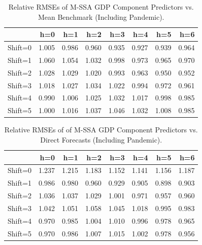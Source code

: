 \documentclass[11pt,a4paper]{article}
\begin{document}
\begin{table}[ht]
\caption{Relative RMSEs of M-SSA GDP Component Predictors vs. Mean Benchmark (Including Pandemic).
\label{tab:rRMSE_mSSA_comp_mean2}}
\centering
\begin{tabular}{rrrrrrrr}
  \hline
 & h=0 & h=1 & h=2 & h=3 & h=4 & h=5 & h=6 \\ 
  \hline
Shift=0 & 1.005 & 0.986 & 0.960 & 0.935 & 0.927 & 0.939 & 0.964 \\ 
  Shift=1 & 1.060 & 1.054 & 1.032 & 0.998 & 0.973 & 0.965 & 0.970 \\ 
  Shift=2 & 1.028 & 1.029 & 1.020 & 0.993 & 0.963 & 0.950 & 0.952 \\ 
  Shift=3 & 1.018 & 1.027 & 1.034 & 1.022 & 0.994 & 0.972 & 0.961 \\ 
  Shift=4 & 0.990 & 1.006 & 1.025 & 1.032 & 1.017 & 0.998 & 0.985 \\ 
  Shift=5 & 1.000 & 1.016 & 1.037 & 1.046 & 1.032 & 1.008 & 0.985 \\  
   \hline
\end{tabular}
\end{table}

\begin{table}[htpb]
\caption{Relative RMSEs of of M-SSA GDP Component Predictors  vs. Direct Forecasts (Including Pandemic).
\label{tab:rRMSE_mSSA_comp_direct3}}
\centering
\begin{tabular}{rrrrrrrr}
  \hline
 & h=0 & h=1 & h=2 & h=3 & h=4 & h=5 & h=6 \\ 
  \hline
Shift=0 & 1.237 & 1.215 & 1.183 & 1.152 & 1.141 & 1.156 & 1.187 \\ 
  Shift=1 & 0.986 & 0.980 & 0.960 & 0.929 & 0.905 & 0.898 & 0.903 \\ 
  Shift=2 & 1.036 & 1.037 & 1.029 & 1.001 & 0.971 & 0.957 & 0.960 \\ 
  Shift=3 & 1.042 & 1.051 & 1.058 & 1.045 & 1.018 & 0.995 & 0.983 \\ 
  Shift=4 & 0.970 & 0.985 & 1.004 & 1.010 & 0.996 & 0.978 & 0.965 \\ 
  Shift=5 & 0.970 & 0.986 & 1.007 & 1.015 & 1.002 & 0.978 & 0.956 \\   
   \hline
\end{tabular}

\end{table}
\end{document}
